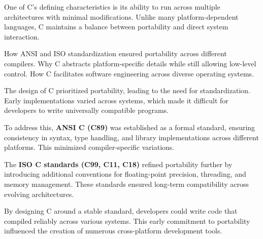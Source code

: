 \begin{NxSSSBox}
	\begin{NxIDBox}
		One of C’s defining characteristics is its ability to run across multiple architectures with minimal modifications. Unlike many platform-dependent languages, C maintains a balance between portability and direct system interaction.
	\end{NxIDBox}
	\begin{NxIDBoxL}
		 How ANSI and ISO standardization ensured portability across different compilers.
		 Why C abstracts platform-specific details while still allowing low-level control.
		 How C facilitates software engineering across diverse operating systems.
	\end{NxIDBoxL}
\end{NxSSSBox}

\begin{NxSSSSBox}
	\begin{NxIDBox}
		The design of C prioritized portability, leading to the need for standardization. Early implementations varied across systems, which made it difficult for developers to write universally compatible programs.
	\end{NxIDBox}
	\begin{NxIDBox}
		To address this, \textbf{ANSI C (C89)} was established as a formal standard, ensuring consistency in syntax, type handling, and library implementations across different platforms. This minimized compiler-specific variations.
	\end{NxIDBox}
	\begin{NxIDBox}
		The \textbf{ISO C standards (C99, C11, C18)} refined portability further by introducing additional conventions for floating-point precision, threading, and memory management. These standards ensured long-term compatibility across evolving architectures.
	\end{NxIDBox}
	\begin{NxIDBox}
		By designing C around a stable standard, developers could write code that compiled reliably across various systems. This early commitment to portability influenced the creation of numerous cross-platform development tools.
	\end{NxIDBox}
\end{NxSSSSBox}

